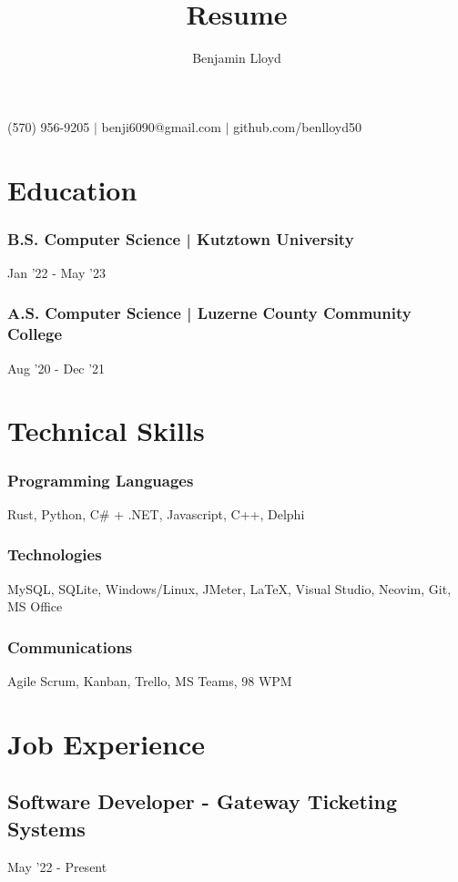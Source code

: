 \documentclass{article}
\makeatletter
\renewcommand{\maketitle}{
\begin{center}
{\huge\bfseries\theauthor}

\vspace{.25em}

{}(570) 956-9205 $\vert$ {}benji6090@gmail.com $\vert$ {}github.com/benlloyd50

\end{center}
}
\makeatother
\begin{document}
\title{Resume}

\author{Benjamin Lloyd}

\maketitle

\section{Education}
\subsubsection{B.S. Computer Science | Kutztown University} \hfill Jan '22 - May '23

\subsubsection{A.S. Computer Science | Luzerne County Community College} \hfill Aug '20 - Dec '21


\section{Technical Skills}

\subsubsection{Programming Languages} Rust, Python, C\# + .NET, Javascript, C++, Delphi

\subsubsection{Technologies} MySQL, SQLite, Windows/Linux, JMeter, {\LaTeX}, Visual Studio, Neovim, Git, MS Office

\subsubsection{Communications} Agile Scrum, Kanban, Trello, MS Teams,  98 WPM

\section{Job Experience}
\subsection{Software Developer - Gateway Ticketing Systems} \hfill May '22 - Present
\end{document}
